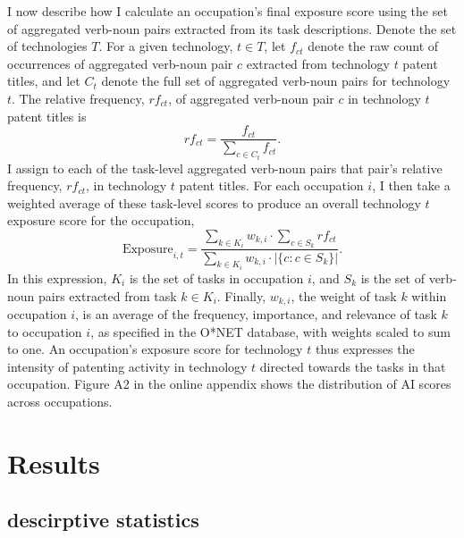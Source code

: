 \documentclass[11pt]{article}
\begin{document}
I now describe how I calculate an occupation’s final exposure score using the set of aggregated
verb-noun pairs extracted from its task descriptions. Denote the set of technologies $T$. For a given
technology, $t \in T$, let $f_{ct}$ denote the raw count of occurrences of aggregated verb-noun pair $c$
extracted from technology $t$ patent titles, and let $C_t$ denote the full set of aggregated verb-noun
pairs for technology $t$. The relative frequency, $rf_{ct}$, of aggregated verb-noun pair $c$ in technology
$t$ patent titles is
\begin{equation}
rf_{ct} = \frac{f_{ct}}{\sum_{c \in C_t} f_{ct}}.
\end{equation}
I assign to each of the task-level aggregated verb-noun pairs that pair's relative frequency, $rf_{ct}$,
in technology $t$ patent titles. For each occupation $i$, I then take a weighted average of these
task-level scores to produce an overall technology $t$ exposure score for the occupation,
\begin{equation}
\mathrm{Exposure}_{i,t} = \frac{\sum_{k \in K_i} w_{k,i} \cdot \sum_{c \in S_k} rf_{ct}}{\sum_{k \in K_i} w_{k,i} \cdot |\{c : c \in S_k\}|}.
\end{equation}
In this expression, $K_i$ is the set of tasks in occupation $i$, and $S_k$ is the set of verb-noun pairs
extracted from task $k \in K_i$. Finally, $w_{k,i}$, the weight of task $k$ within occupation $i$, is an average of the
frequency, importance, and relevance of task $k$ to occupation $i$, as specified in the O*NET database,
with weights scaled to sum to one.
An occupation’s exposure score for technology $t$ thus expresses the intensity of patenting activity
in technology $t$ directed towards the tasks in that occupation. Figure A2 in the online appendix
shows the distribution of AI scores across occupations.




\section{Results}

\subsection{descirptive statistics}
\end{document}
